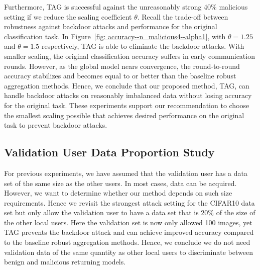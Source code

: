 \documentclass{article} %
\begin{document}
Furthermore, TAG is successful against the unreasonably strong 40\% malicious setting if we reduce the scaling coefficient $\theta$. Recall the trade-off between robustness against backdoor attacks and performance for the original classification task. In Figure~\ref{fig: accuracy--n_malicious4--alpha1}, with $\theta=1.25$ and $\theta=1.5$ respectively, TAG is able to eliminate the backdoor attacks. With smaller scaling, the original classification accuracy suffers in early communication rounds. However, as the global model nears convergence, the round-to-round accuracy stabilizes and becomes equal to or better than the baseline robust aggregation methods. Hence, we conclude that our proposed method, TAG, can handle backdoor attacks on reasonably imbalanced data without losing accuracy for the original task. These experiments support our recommendation to choose the smallest scaling possible that achieves desired performance on the original task to prevent backdoor attacks.


\begin{figure}[htp]
\centering
\end{figure}




%
\subsection{Validation User Data Proportion Study}

For previous experiments, we have assumed that the validation user has a data set of the same size as the other users. In most cases, data can be acquired. However, we want to determine whether our method depends on such size requirements. Hence we revisit the strongest attack setting for the CIFAR10 data set but only allow the validation user to have a data set that is 20\% of the size of the other local users. Here the validation set is now only allowed 100 images, yet TAG prevents the backdoor attack and can achieve improved accuracy compared to the baseline robust aggregation methods. Hence, we conclude we do not need validation data of the same quantity as other local users to discriminate between benign and malicious returning models.
\end{document}
